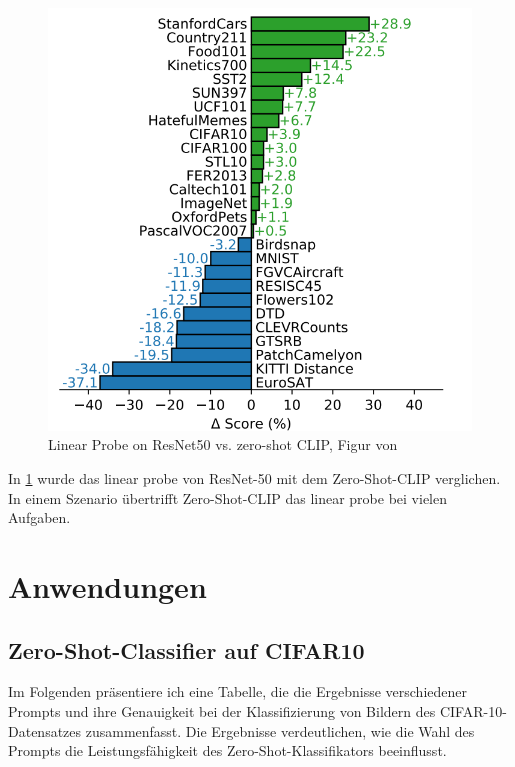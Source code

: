 \documentclass[nolibertine, ngerman, algorithm, nomencl, minted]{ttlab-qualify}
\begin{document}
\begin{figure}[h!]
	\centering
	\includegraphics[scale=0.4]{static/clip_vs_resnet50.png}
	\caption{Linear Probe on ResNet50 vs. zero-shot CLIP, Figur von \textcite[8]{radford2021learning}}
	\label{fig:2.8}
\end{figure}


In \ref{fig:2.8} \parencite[vgl.][]{radford2021learning} wurde das linear probe von ResNet-50 mit dem Zero-Shot-CLIP verglichen. 
In einem Szenario übertrifft Zero-Shot-CLIP das linear probe bei vielen Aufgaben.


\section{Anwendungen}
\label{sec:Anwendung}
\subsection{Zero-Shot-Classifier auf CIFAR10}
Im Folgenden präsentiere ich eine Tabelle, die die Ergebnisse verschiedener Prompts und ihre Genauigkeit bei der 
Klassifizierung von Bildern des CIFAR-10-Datensatzes zusammenfasst. Die Ergebnisse verdeutlichen, wie die Wahl des 
Prompts die Leistungsfähigkeit des Zero-Shot-Klassifikators beeinflusst.
\end{document}
